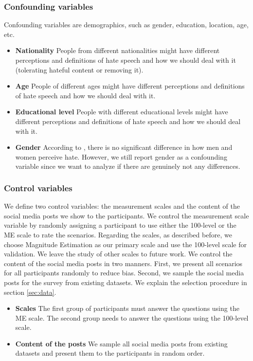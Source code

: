 \subsubsection{Confounding variables}
%
Confounding variables are demographics, such as gender, education, location, age, etc.
%
\begin{itemize}
    \item \textbf{Nationality} People from different nationalities might have different perceptions and definitions of hate speech and how we should deal with it (tolerating hateful content or removing it).
    \item \textbf{Age} People of different ages might have different perceptions and definitions of hate speech and how we should deal with it.
    \item \textbf{Educational level} People with different educational levels might have different perceptions and definitions of hate speech and how we should deal with it.
    \item \textbf{Gender} According to \citet{gold2018women}, there is no significant difference in how men and women perceive hate. However, we still report gender as a confounding variable since we want to analyze if there are genuinely not any differences.
\end{itemize}

\subsubsection{Control variables}
%
We define two control variables: the measurement scales and the content of the social media posts we show to the participants.
%
We control the measurement scale variable by randomly assigning a participant to use either the 100-level or the ME scale to rate the scenarios.
%
Regarding the scales, as described before, we choose Magnitude Estimation as our primary scale and use the 100-level scale for validation.
%
We leave the study of other scales to future work.
%
We control the content of the social media posts in two manners.
%
First, we present all scenarios for all participants randomly to reduce bias.
%
Second, we sample the social media posts for the survey from existing datasets.
% 
We explain the selection procedure in section \ref{sec:data}.
%
\begin{itemize}
    \item \textbf{Scales} The first group of participants must answer the questions using the ME scale. The second group needs to answer the questions using the 100-level scale.
    \item \textbf{Content of the posts} We sample all social media posts from existing datasets and present them to the participants in random order.
\end{itemize}

